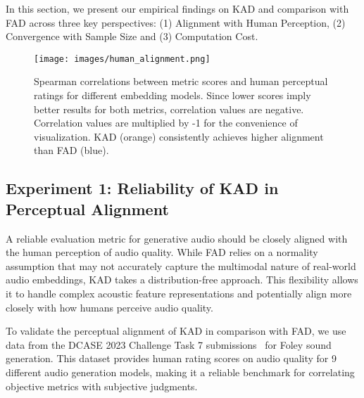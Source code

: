 In this section, we present our empirical findings on KAD and comparison with FAD across three key perspectives: (1) Alignment with Human Perception, (2) Convergence with Sample Size and (3) Computation Cost.

\begin{figure}[t]
    \centering
    \texttt{[image: images/human\_alignment.png]}
    \caption{Spearman correlations between metric scores and human perceptual ratings for different embedding models. Since lower scores imply better results for both metrics, correlation values are negative. Correlation values are multiplied by -1 for the convenience of visualization. KAD (orange) consistently achieves higher alignment than FAD (blue).}
    \label{fig:human_alignment}
\end{figure}

\subsection{Experiment 1: Reliability of KAD in Perceptual Alignment}
\label{ssec:human_perception}
A reliable evaluation metric for generative audio should be closely aligned with the human perception of audio quality. While FAD relies on a normality assumption that may not accurately capture the multimodal nature of real-world audio embeddings, KAD takes a distribution-free approach. This flexibility allows it to handle complex acoustic feature representations and potentially align more closely with how humans perceive audio quality.

To validate the perceptual alignment of KAD in comparison with FAD, we use data from the DCASE 2023 Challenge Task 7 submissions~\cite{dcase2023,BaiJLESS2023,ChangHYU2023,ChonGLI2023,ChunChosun2023,ChungKAIST2023,GuanHEU2023,JungKT2023,KamathNUS2023,LeeMARG2023,Leemaum2023,PillayCMU2023,WendnerJKU2023,XieSJTU2023,YiSURREY2023,QianbinBIT2023,QianXuBIT2023,ScheiblerLINE2023} for Foley sound generation. This dataset provides human rating scores on audio quality for 9 different audio generation models, making it a reliable benchmark for correlating objective metrics with subjective judgments.

